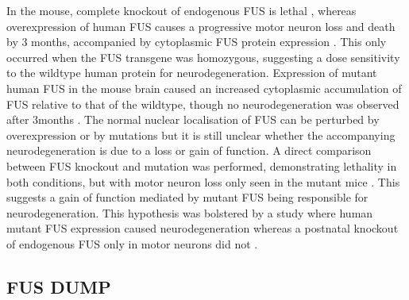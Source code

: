 In the mouse, complete knockout of endogenous FUS is lethal \citep{Hicks2000}, whereas overexpression of human FUS causes a progressive motor neuron loss and death by 3 months, accompanied by cytoplasmic FUS protein expression \citep{Mitchell2013}. This only occurred when the FUS transgene was homozygous, suggesting a dose sensitivity to the wildtype human protein for neurodegeneration. Expression of mutant human FUS in the mouse brain caused an increased cytoplasmic accumulation of FUS relative to that of the wildtype, though no neurodegeneration was observed after 3months \citep{Verbeeck2012}. 
The normal nuclear localisation of FUS can be perturbed by overexpression or by mutations but it is still unclear whether the accompanying neurodegeneration is due to a loss or gain of function. A direct comparison between FUS knockout and mutation was performed, demonstrating lethality in both conditions, but with motor neuron loss only seen in the mutant mice \citep{Scekic-zahirovic2016}. This suggests a gain of function mediated by mutant FUS being responsible for neurodegeneration. This hypothesis was bolstered by a study where human mutant FUS expression caused neurodegeneration whereas a postnatal knockout of endogenous FUS only in motor neurons did not \citep{Sharma2016}. 


\subsection{FUS DUMP}

